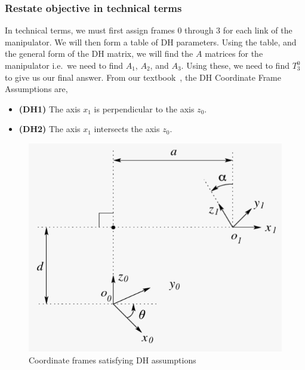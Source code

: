 \documentclass[conference]{IEEEtran}
\begin{document}
\subsubsection{Restate objective in technical terms}
In technical terms, we must first assign frames 0 through 3 for
each link of the manipulator. We will then form a table of DH
parameters. Using the table, and the general form of the DH matrix,
we will find the $A$ matrices for the manipulator i.e.\ we need to find
$A_1$, $A_2$, and $A_3$. Using these, we need to find $T^0_3$
to give us our final answer. From our textbook~\cite{Spong2006}, the 
DH Coordinate Frame Assumptions are,
\begin{itemize}
    \item \textbf{(DH1)} The axis $x_1$ is perpendicular to the axis $z_0$.
    \item \textbf{(DH2)} The axis $x_1$ intersects the axis $z_0$.
\end{itemize}
\vspace{0.1in}
\begin{figure}[h]
    \centering
    \includegraphics[scale=0.4]{dh-frames.png}
    \caption{Coordinate frames satisfying DH assumptions}
\end{figure}
\vspace{0.1in}
\end{document}
